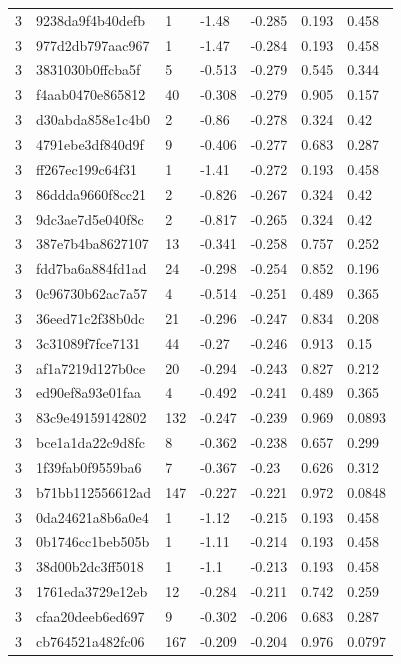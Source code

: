\begin{tabular}{lllllll}
3 & 9238da9f4b40defb & 1 & -1.48 & -0.285 & 0.193 & 0.458 \\
3 & 977d2db797aac967 & 1 & -1.47 & -0.284 & 0.193 & 0.458 \\
3 & 3831030b0ffcba5f & 5 & -0.513 & -0.279 & 0.545 & 0.344 \\
3 & f4aab0470e865812 & 40 & -0.308 & -0.279 & 0.905 & 0.157 \\
3 & d30abda858e1c4b0 & 2 & -0.86 & -0.278 & 0.324 & 0.42 \\
3 & 4791ebe3df840d9f & 9 & -0.406 & -0.277 & 0.683 & 0.287 \\
3 & ff267ec199c64f31 & 1 & -1.41 & -0.272 & 0.193 & 0.458 \\
3 & 86ddda9660f8cc21 & 2 & -0.826 & -0.267 & 0.324 & 0.42 \\
3 & 9dc3ae7d5e040f8c & 2 & -0.817 & -0.265 & 0.324 & 0.42 \\
3 & 387e7b4ba8627107 & 13 & -0.341 & -0.258 & 0.757 & 0.252 \\
3 & fdd7ba6a884fd1ad & 24 & -0.298 & -0.254 & 0.852 & 0.196 \\
3 & 0c96730b62ac7a57 & 4 & -0.514 & -0.251 & 0.489 & 0.365 \\
3 & 36eed71c2f38b0dc & 21 & -0.296 & -0.247 & 0.834 & 0.208 \\
3 & 3c31089f7fce7131 & 44 & -0.27 & -0.246 & 0.913 & 0.15 \\
3 & af1a7219d127b0ce & 20 & -0.294 & -0.243 & 0.827 & 0.212 \\
3 & ed90ef8a93e01faa & 4 & -0.492 & -0.241 & 0.489 & 0.365 \\
3 & 83c9e49159142802 & 132 & -0.247 & -0.239 & 0.969 & 0.0893 \\
3 & bce1a1da22c9d8fc & 8 & -0.362 & -0.238 & 0.657 & 0.299 \\
3 & 1f39fab0f9559ba6 & 7 & -0.367 & -0.23 & 0.626 & 0.312 \\
3 & b71bb112556612ad & 147 & -0.227 & -0.221 & 0.972 & 0.0848 \\
3 & 0da24621a8b6a0e4 & 1 & -1.12 & -0.215 & 0.193 & 0.458 \\
3 & 0b1746cc1beb505b & 1 & -1.11 & -0.214 & 0.193 & 0.458 \\
3 & 38d00b2dc3ff5018 & 1 & -1.1 & -0.213 & 0.193 & 0.458 \\
3 & 1761eda3729e12eb & 12 & -0.284 & -0.211 & 0.742 & 0.259 \\
3 & cfaa20deeb6ed697 & 9 & -0.302 & -0.206 & 0.683 & 0.287 \\
3 & cb764521a482fc06 & 167 & -0.209 & -0.204 & 0.976 & 0.0797 \\

\end{tabular}
